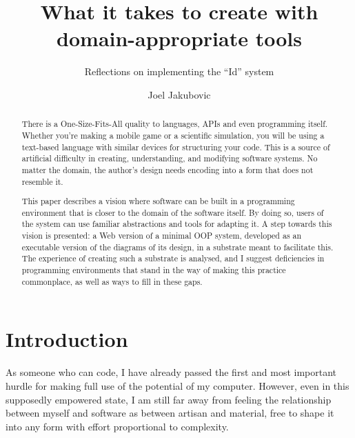 \newcommand{\OROM}{Id}
\title{What it takes to create with domain-appropriate tools}
\subtitle{Reflections on implementing the ``Id{}'' system}
\author[ ]{Joel Jakubovic}

\newcommand{\joel}[1]{}
\newcommand{\svgel}[1]{\texttt{\textless{}#1\textgreater{}}}
\newcommand{\OSFA}{One-Size-Fits-All}
\newcommand{\xywh}{\texttt{x},\texttt{y},\texttt{width},\texttt{height}}

\begin{abstract}
There is a One-Size-Fits-All{} quality to languages, APIs and even programming itself. Whether you're making a mobile game or a scientific simulation, you will be using a text-based language with similar devices for structuring your code. This is a source of artificial difficulty in creating, understanding, and modifying software systems. No matter the domain, the author's design needs encoding into a form that does not resemble it.

This paper describes a vision where software can be built in a programming environment that is closer to the domain of the software itself. By doing so, users of the system can use familiar abstractions and tools for adapting it. A step towards this vision is presented: a Web version of a minimal OOP system, developed as an executable version of the diagrams of its design, in a substrate meant to facilitate this. The experience of creating such a substrate is analysed, and I suggest deficiencies in programming environments that stand in the way of making this practice commonplace, as well as ways to fill in these gaps.
\end{abstract}

\maketitle


\hypertarget{introduction}{%
\section{Introduction}\label{introduction}}

As someone who can code, I have already passed the first and most
important hurdle for making full use of the potential of my computer.
However, even in this supposedly empowered state, I am still far away
from feeling the relationship between myself and software as between
artisan and material, free to shape it into any form with effort
proportional to complexity.

